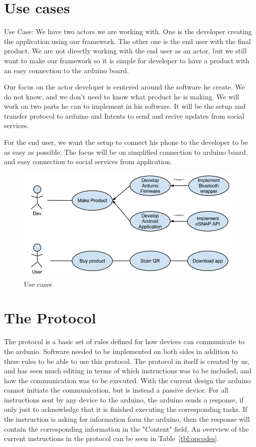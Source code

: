 \newpage
\section{Use cases}
Use Case:
We have two actors we are working with. One is the developer creating the application using our framework. The other one is the end user with the final product. We are not directly working with the end user as an actor, but we still want to make our framework so it is simple for developer to have a product with an easy connection to the arduino board.

Our focus on the actor developer is centered around the software he create. We do not know, and we don't need to know what product he is making. We will work on two parts he can to implement in his software. It will be the setup and transfer protocol to arduino and Intents to send and recive updates from social services.

For the end user, we want the setup to connect his phone to the developer to be as easy as possible. The focus will be on simplified connection to arduino board, and easy connection to social services from application.
\begin{figure}[hb!]
\centering \includegraphics[scale=0.50]{img/use-cases.png}
\caption{Use cases}
\label{fig:architecture-usecases}
\end{figure}

\section{The Protocol}

The protocol is a basic set of rules defined for how devices can communicate to the ardunio. Software needed to be implemented on both sides in addition to these rules to be able to use this protocol. The protocol in itself is created by us, and has seen much editing in terms of which instructions was to be included, and how the communication was to be executed. With the current design the arduino cannot initiate the communication, but is instead a passive device. For all instructions sent by any device to the arduino, the arduino sends a response, if only just to acknowledge that it is finished executing the corresponding tasks. If the instruction is asking for information form the arduino, then the response will contain the corresponding information in the "Content" field. An overview of the current instructions in the protocol can be seen in Table~\ref{tbl:opcodes}.

